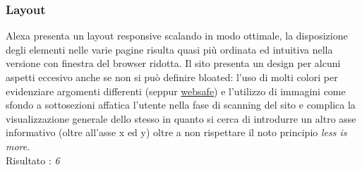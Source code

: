 \subsubsection{Layout}
Alexa presenta un layout responsive scalando in modo ottimale, la disposizione degli
elementi nelle varie pagine risulta quasi più ordinata ed intuitiva nella versione
con finestra del browser ridotta.
Il sito presenta un design per alcuni aspetti eccesivo anche se non si può definire bloated: l'uso di molti colori per evidenziare argomenti differenti (seppur \href{http://www.w3schools.com/html/html_colors.asp}{websafe}) e l'utilizzo di immagini come sfondo a sottosezioni affatica l'utente nella 
fase di scanning del sito e complica la visualizzazione generale dello stesso in quanto si cerca di introdurre un altro asse informativo (oltre all'asse x ed y) oltre a non rispettare il noto principio \textit{less is more}. \\
Risultato : \textit{6}